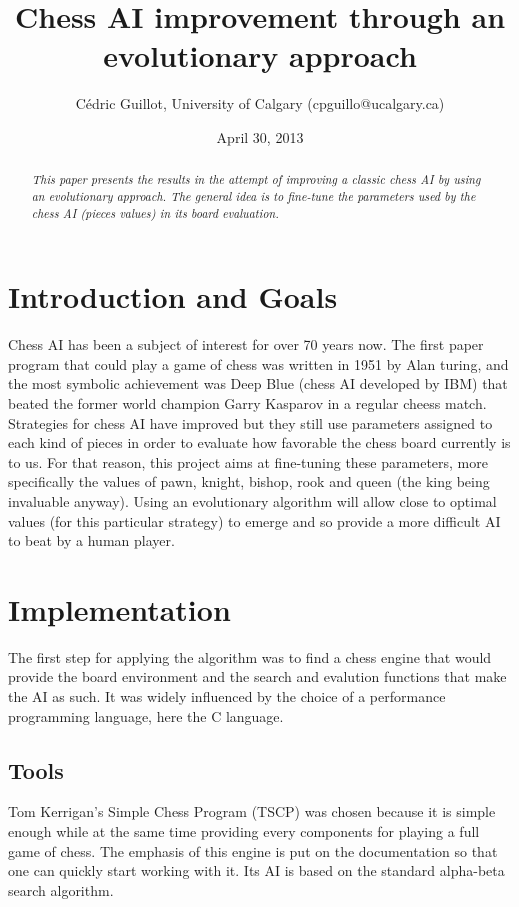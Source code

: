 \documentclass[11pt,a4paper,twocolumn]{article}
\title{Chess AI improvement through an evolutionary approach}
\author{Cédric Guillot, University of Calgary (cpguillo@ucalgary.ca)}
\date{April 30, 2013}
\begin{document}
\maketitle

\begin{abstract}
\textit{This paper presents the results in the attempt of improving a classic chess AI by using an evolutionary approach. The general idea is to fine-tune the parameters used by the chess AI (pieces values) in its board evaluation.}
\end{abstract}

\section{Introduction and Goals}
Chess AI has been a subject of interest for over 70 years now. The first paper program that could play a game of chess was written in 1951 by Alan turing, and the most symbolic achievement was Deep Blue (chess AI developed by IBM) that beated the former world champion Garry Kasparov in a regular cheess match.\\
Strategies for chess AI have improved but they still use parameters assigned to each kind of pieces in order to evaluate how favorable the chess board currently is to us. For that reason, this project aims at fine-tuning these parameters, more specifically the values of pawn, knight, bishop, rook and queen (the king being invaluable anyway). Using an evolutionary algorithm will allow close to optimal values (for this particular strategy) to emerge and so provide a more difficult AI to beat by a human player.

\section{Implementation}
The first step for applying the algorithm was to find a chess engine that would provide the board environment and the search and evalution functions that make the AI as such. It was widely influenced by the choice of a performance programming language, here the C language.

\subsection{Tools}
Tom Kerrigan’s Simple Chess Program (TSCP) was chosen because it is simple enough while at the same time providing every components for playing a full game of chess. The emphasis of this engine is put on the documentation so that one can quickly start working with it. Its AI is based on the standard alpha-beta search algorithm.\\
\end{document}
